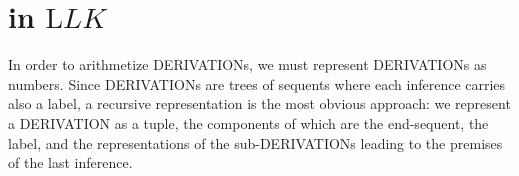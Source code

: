 \documentclass[10pt,a4paper]{article}
\newcommand*{\olup}[1]{\MakeUppercase{#1}}
\theoremstyle{plain}
\theoremstyle{definition}
\theoremstyle{remark}
\newenvironment{explain}{}{}
\newcommand*{\olfileid}[3]{}
\newcommand*{\olsection}[1]{\section*{#1}}
\providecommand{\Log}{\ensuremath{\mathrm{L}}}
\begin{document}



\olfileid{inc}{art}{plk}
\olsection{ in $\Log{LK}$}

\begin{explain}
In order to arithmetize \olup{derivation}s, we must represent
\olup{derivation}s as numbers. Since \olup{derivation}s are trees of sequents
where each inference carries also a label, a recursive
representation is the most obvious approach: we represent a
\olup{derivation} as a tuple, the components of which are the
end-sequent, the label, and the representations of the
sub-\olup{derivation}s leading to the premises of the last inference.
\end{explain}
\end{document}
